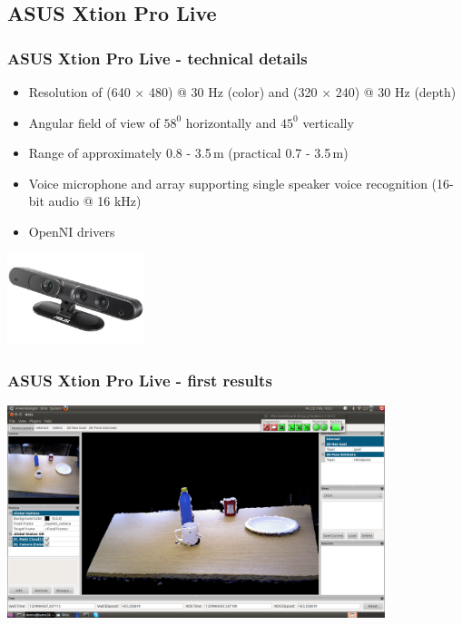 \subsection{ASUS Xtion Pro Live}
\begin{frame}
 \frametitle{ASUS Xtion Pro Live - technical details}
\begin{itemize}
  \item Resolution of (640 $\times$ 480) @ 30 Hz (color) and (320 $\times$ 240) @ 30 Hz (depth)
  \item Angular field of view of $58^0$ horizontally and $45^0$ vertically
  \item Range of approximately 0.8 - 3.5\,m (practical 0.7 - 3.5\,m)
  \item Voice microphone and array supporting single speaker voice recognition (16-bit audio @ 16 kHz)
  \item OpenNI drivers
\end{itemize}
\vspace{1ex}\hspace{39ex}\includegraphics[width=4cm]{../images/asus_xtion.jpg}
\end{frame}

\begin{frame}
 \frametitle{ASUS Xtion Pro Live - first results}
\includegraphics[width=11cm]{../images/asus2.png}
\end{frame}

